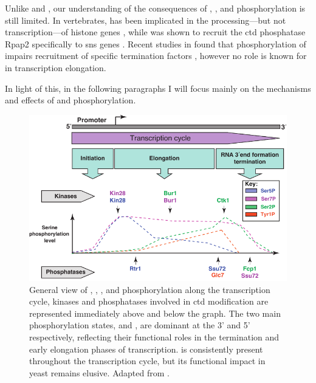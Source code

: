 Unlike \sert{} and \serf{}, our understanding of the consequences of \tyr{}, \thr{}, and \sers{} phosphorylation is still limited. 
In vertebrates, \thr{} has been implicated in the processing---but not transcription---of histone genes  \cite{hsin:2011:rnap}, while \sers{} was shown to recruit the \gls{ctd} phosphatase Rpap2 specifically to \gls{sns} genes \citep{egloff:2012:role}.
Recent studies in \cer{} found that phosphorylation of \tyr{} impairs recruitment of specific termination factors \cite{mayer:2012:ctd,schreieck:2014:rna} , however no role is known for \tyr{} in transcription elongation.  

In light of this, in the following paragraphs I will focus mainly on the mechanisms and effects of \sert{} and \serf{} phosphorylation.

\begin{figure}[ht]

\centering
\includegraphics[width=\textwidth]{figures/introduction/ctdPhospho}
\caption[CTD phosphorylation states throughout the transcription cycle.]{
General view of \sert{}, \serf{}, \sers{}, and \tyr{} phosphorylation along the transcription cycle,
kinases and phosphatases involved in \gls{ctd} modification are represented immediately above and below the graph.
The two main phosphorylation states, \sert{} and \serf{}, are dominant at the 3' and 5' respectively, reflecting their functional roles in the termination and early elongation phases of transcription.
\sers{} is consistently present throughout the transcription cycle, but its functional impact in yeast remains elusive. Adapted from \citep{egloff:2012:updating}.
}
\label{fig:ctdPhospho}

\end{figure}

